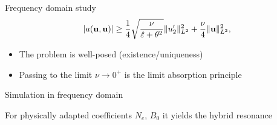 \begin{frame}{Frequency domain study}
\[
|a({\bf u},{\bf u})| \geq \frac{1}{4} \sqrt{\frac{\nu}{{\hat{{\bf \varepsilon}}} + \theta^2}}\|u_2'\|^2_{L^2} +  \frac{\nu}{4} \|{\bf u}\|_{L^2}^2,
\]

\vspace*{0.5cm}
\begin{block}{}
\begin{itemize}
\item The problem is well-posed (existence/uniqueness)
\item Passing to the limit $\nu \rightarrow 0^+$ is the limit absorption principle
\end{itemize}
\end{block}
\end{frame}

\begin{frame}{Simulation in frequency domain}

For physically adapted coefficients $N_e$, $B_0$ it yields the hybrid resonance 

\ \\


\end{frame}
